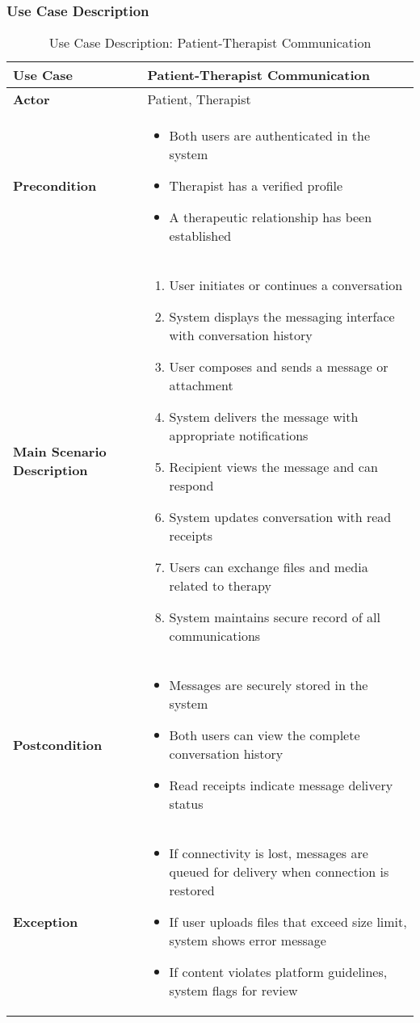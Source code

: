 \subsubsection{Use Case Description}
\begin{table}[h]
\centering
\begin{tabular}{|p{3cm}|p{10cm}|}
\hline
\textbf{Use Case} & Patient-Therapist Communication \\
\hline
\textbf{Actor} & Patient, Therapist \\
\hline
\textbf{Precondition} & 
\begin{itemize}
    \item Both users are authenticated in the system
    \item Therapist has a verified profile
    \item A therapeutic relationship has been established
\end{itemize} \\
\hline
\textbf{Main Scenario Description} & 
\begin{enumerate}
    \item User initiates or continues a conversation
    \item System displays the messaging interface with conversation history
    \item User composes and sends a message or attachment
    \item System delivers the message with appropriate notifications
    \item Recipient views the message and can respond
    \item System updates conversation with read receipts
    \item Users can exchange files and media related to therapy
    \item System maintains secure record of all communications
\end{enumerate} \\
\hline
\textbf{Postcondition} & 
\begin{itemize}
    \item Messages are securely stored in the system
    \item Both users can view the complete conversation history
    \item Read receipts indicate message delivery status
\end{itemize} \\
\hline
\textbf{Exception} & 
\begin{itemize}
    \item If connectivity is lost, messages are queued for delivery when connection is restored
    \item If user uploads files that exceed size limit, system shows error message
    \item If content violates platform guidelines, system flags for review
\end{itemize} \\
\hline
\end{tabular}
\caption{Use Case Description: Patient-Therapist Communication}
\end{table}

